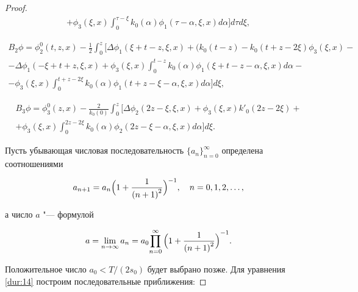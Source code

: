 \begin{proof}
\begin{multline*}
+{\phi _3}(\xi ,x)\int_0^{\tau  - \xi } {{k_0}(\alpha ){\phi _1}(\tau  - \alpha ,\xi ,x)d\alpha }  \biggr]d\tau d\xi ,

\end{multline*}

\begin{multline*}

{B_2}\phi  = \phi _2^0(t, z, x)  

- \frac 12 \int_0^z \biggl[   \Delta {\phi _1}(\xi  + t - z,\xi ,x) + 

(  {k_0}(t - z) - {k_0}( t + z - 2\xi ){\phi _3}(\xi ,x) - 

\\

- \Delta {\phi _1}( - \xi  + t + z,\xi ,x) + {\phi _3}(\xi ,x)\int_0^{t - z} {k_0}(\alpha ) {\phi _1}(\xi  + t - z - \alpha , \xi ,x)d\alpha  - 

\\

 - {\phi _3}(\xi ,x)\int_0^{t + z - 2\xi } {{k_0}(\alpha ){\phi _1}(t + z - \xi  - \alpha ,\xi ,x)d\alpha    \biggr]d\xi }, 

\end{multline*}

\begin{multline*}

{B_3}\phi  = \phi _3^0( z,x) - \frac{2}{k_0(0)}\int_0^z \biggl[ \Delta \phi _2(2z - \xi ,\xi ,x) + \phi _3(\xi ,x)k'_0(2z - 2\xi ) +

\\

+ \phi _3(\xi ,x)\int_0^{2z - 2\xi } k_0(\alpha )\phi _2(2z - \xi  - \alpha ,\xi ,x)d\alpha  \biggr]d\xi . 

\end{multline*}





\noindent

  Пусть убывающая числовая последовательность $\{{a_n}\}_{n=0}^{\infty}$ определена соотношениями

$${a_{n + 1}} = {a_n}{\Bigl( {1 + \frac{1}{{{{(n + 1)}^2}}}} \Bigr)^{ - 1}},\quad n = 0, 1, 2, \ldots,$$

а число $a$ "--- формулой

\[a = \mathop {\lim }\limits_{n \to \infty } {a_n} = {a_0}{\prod\limits_{n = 0}^\infty  {\Bigl( {1 + \frac{1}{{{{(n + 1)}^2}}}} \Bigr)} ^{ - 1}}.\]

 Положительное число ${a_0} < {T}/({{2{s_0}}})$ будет выбрано позже. Для уравнения \eqref{dur:14} построим последовательные приближения:


\end{proof}
